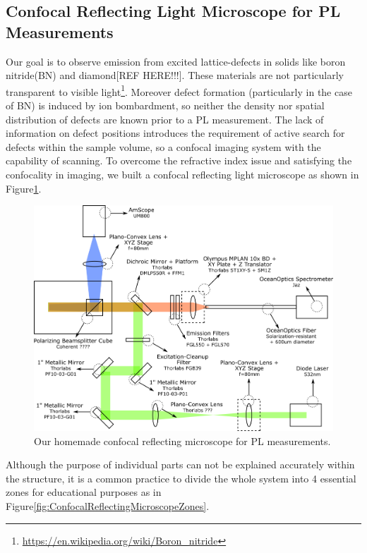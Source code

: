 \subsection{Confocal Reflecting Light Microscope for PL Measurements}

Our goal is to observe emission from excited lattice-defects in solids like boron 
nitride(BN) and diamond[REF HERE!!!]. These materials are not particularly transparent
to visible light\footnote{\url{https://en.wikipedia.org/wiki/Boron_nitride}}. Moreover
defect formation (particularly in the case of BN) is induced by ion bombardment, so
neither the density nor spatial distribution of defects are known prior to a PL 
measurement. The lack of information on defect positions introduces the requirement 
of active search for defects within the sample volume, so a confocal imaging system 
with the capability of scanning. To overcome the refractive index issue and satisfying 
the confocality in imaging, we built a confocal reflecting light microscope as shown
in Figure\ref{fig:ConfocalReflectingMicroscopeFull}.

\begin{figure}[H]
	\centering
	\includegraphics[angle=0,origin=c,width = 0.95\linewidth]{Section_Microscope/Figures/PL_Setup_Parts.png}
	\caption{Our homemade confocal reflecting microscope for PL measurements.}
	\label{fig:ConfocalReflectingMicroscopeFull}
\end{figure}

Although the purpose of individual parts can not be explained accurately within the 
structure, it is a common practice to divide the whole system into 4 essential zones 
for educational purposes as in Figure\ref{fig:ConfocalReflectingMicroscopeZones}. 

